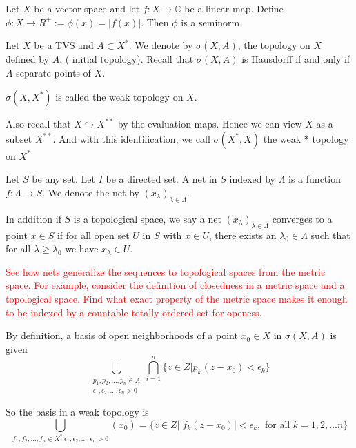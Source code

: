
\chapter{}

\begin{example}
  Let $X$ be a vector space and let $f: X \to \mathbb{C}$ be a linear map. Define $\phi: X \to R^{+} := \phi(x) = |f(x)|$. Then $\phi$ is a seminorm.
\end{example}

\begin{remark}
  Let $X$ be a TVS and $A \subset X^{*}$. We denote by $ \sigma(X, A)$, the topology on $X$ defined by $A$. ( initial topology).
  Recall that $\sigma(X, A)$ is Hausdorff if and only if $A$ separate points of $X$.

  $\sigma(X, X^{*})$ is called the weak topology on $X$.
 
  Also recall that $X \hookrightarrow X^{**}$ by the evaluation maps. Hence we can view $X$ as a subset $X^{**}$. And with this identification, we call $\sigma(X^{*}, X)$ the weak $*$ topology on $X^{*}$

\end{remark}

\begin{definition}
  Let $S$ be any set. Let $I$ be a directed set. A net in $S$ indexed by $\Lambda$ is a function $f:\Lambda \to S$. We denote the net by $(x_\lambda)_{\lambda \in \Lambda}$. 

  In addition if $S$ is a topological space, we say a net $(x_\lambda)_{\lambda \in \Lambda}$ converges to a point $x \in S$ if  for all open set $U$ in $S$ with $x \in U$, there exists an $\lambda_0 \in \Lambda$ such that for all $\lambda \ge \lambda_0$ we have $x_\lambda \in U$.
\end{definition}

\textcolor{red}{See how nets generalize the sequences to topological spaces from the metric space. For example, consider the definition of closedness in a metric space and a topological space. Find what exact property of the metric space makes it enough to be indexed by a countable totally ordered set for openess.}

\begin{remark}
  By definition, a basis of open neighborhoods of a point $x_0 \in X$ in $\sigma(X, A)$ is given \[
    \bigcup_{\substack{p_1 , p_2 , \ldots , p_n \in A \\ \epsilon_1 , \epsilon_2 , \ldots , \epsilon_n > 0}}\bigcap_{i = 1}^{n} \{ z \in Z | p_k(z-x_0) < \epsilon_k \}
  \]

  So the basis in a weak topology is \[
    \bigcup_{f_1 , f_2 , \ldots , f_n \in X^{*} \ \epsilon_1 , \epsilon_2 , \ldots , \epsilon_n > 0}(x_0) = \{  z \in Z \Big| |f_k(z- x_0)|< \epsilon_k, \textrm{ for all } k = 1, 2, \ldots n \}
  \]
\end{remark}


